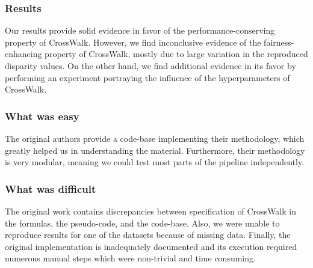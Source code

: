 \subsubsection*{Results}


Our results provide solid evidence in favor of the performance-conserving property of CrossWalk. However, we find inconclusive evidence of the fairness-enhancing property of CrossWalk, mostly due to large variation in the reproduced disparity values. On the other hand, we find additional evidence in its favor by performing an experiment portraying the influence of the hyperparameters of CrossWalk.

\subsubsection*{What was easy}

The original authors provide a code-base implementing their methodology, which greatly helped us in understanding the material. Furthermore, their methodology is very modular, meaning we could test most parts of the pipeline independently. 

\subsubsection*{What was difficult}


The original work contains discrepancies between specification of CrossWalk in the formulas, the pseudo-code, and the code-base. Also, we were unable to reproduce results for one of the datasets because of missing data. Finally, the original implementation is inadequately documented and its execution required numerous manual steps which were non-trivial and time consuming.


